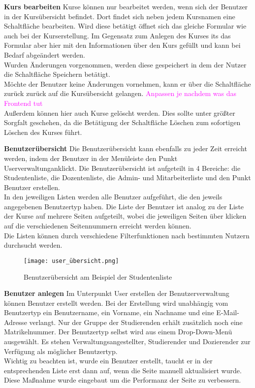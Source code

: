 \textbf{Kurs bearbeiten}
Kurse können nur bearbeitet werden, wenn sich der Benutzer in der Kursübersicht befindet. Dort findet sich neben jedem Kursnamen eine Schaltfläche \glqq bearbeiten\grqq . Wird diese betätigt öffnet sich das gleiche Formular wie auch bei der Kurserstellung. Im Gegensatz zum Anlegen des Kurses its das Formular aber hier mit den Informationen über den Kurs gefüllt und kann bei Bedarf abgeändert werden.\\
Wurden Änderungen vorgenommen, werden diese gespeichert in dem der Nutzer die Schaltfläche \glqq Speichern\grqq\: betätigt.\\
Möchte der Benutzer keine Änderungen vornehmen, kann er über die Schaltfläche \glqq zurück\grqq\: zurück auf die Kursübersicht gelangen. \textcolor{magenta}{Anpassen je nachdem was das Frontend tut}\\
Außerdem können hier auch Kurse gelöscht werden. Dies sollte unter größter Sorgfalt geschehen, da die Betätigung der Schaltfläche \glqq Löschen\grqq\: zum sofortigen Löschen des Kurses führt.


\textbf{Benutzerübersicht}
Die Benutzerübersicht kann ebenfalls zu jeder Zeit erreicht werden, indem der Benutzer in der Menüleiste den Punkt \glqq Userverwaltung\grqq anklickt.
Die Benutzerübersicht ist aufgeteilt in 4 Bereiche: die Studentenliste, die Dozentenliste, die Admin- und Mitarbeiterliste und den Punkt Benutzer erstellen. \\
In den jeweiligen Listen werden alle Benutzer aufgeführt, die den jeweils angegebenen Benutzertyp haben. Die Liste der Benutzer ist analog zu der Liste der Kurse auf mehrere Seiten aufgeteilt, wobei die jeweiligen Seiten über klicken auf die verschiedenen Seitennummern erreicht werden können.\\
Die Listen können durch verschiedene Filterfunktionen nach bestimmten Nutzern durchsucht werden. 
\begin{figure}[h]
\centering
\texttt{[image: user\_übersicht.png]}
\caption{Benutzerübersicht am Beispiel der Studentenliste}
\label{fib:kü}
\end{figure}

\textbf{Benutzer anlegen}
Im Unterpunkt \glqq User erstellen\grqq\: der Benutzerverwaltung können Benutzer erstellt werden. Bei der Erstellung wird unabhängig vom Benutzertyp ein Benutzername, ein Vorname, ein Nachname und eine E-Mail-Adresse verlangt. Nur der Gruppe der Studierenden erhält zusätzlich noch eine Matrikelnummer. Der Benutzertyp selbst wird aus einem Drop-Down-Menü ausgewählt. Es stehen Verwaltungsangestellter, Studierender und Dozierender zur Verfügung als möglicher Benutzertyp. \\
Wichtig zu beachten ist, wurde ein Benutzer erstellt, taucht er in der entsprechenden Liste erst dann auf, wenn die Seite manuell aktualisiert wurde. Diese Maßnahme wurde eingebaut um die Performanz der Seite zu verbessern.

